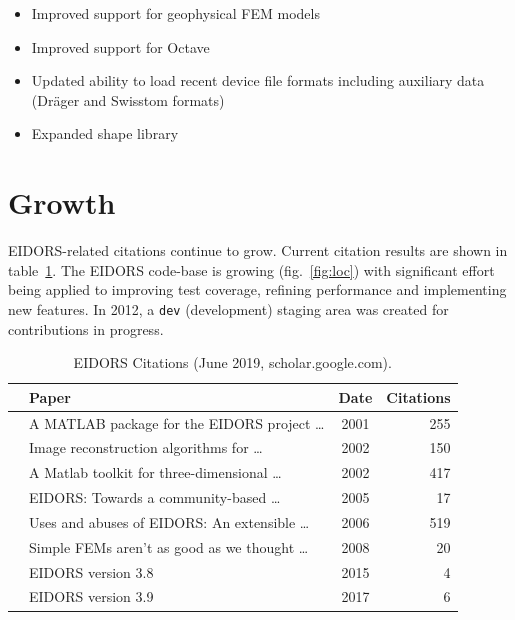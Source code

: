 \documentclass[10pt,letterpaper]{article}
\begin{document}
\begin{multicols}{2}
\begin{itemize}


\item Improved support for geophysical FEM models


\item Improved support for Octave

\item Updated ability to load recent device file formats including
       auxiliary data (Dr\"ager and Swisstom formats)




\item Expanded shape library
\end{itemize}

\section{Growth}
EIDORS-related citations continue to grow. Current citation results are
shown in table~\ref{tbl:cite}.
%
The EIDORS code-base is growing
(fig.~\ref{fig:loc})
 with significant effort being applied to
improving test coverage, refining performance and implementing new features.
 In 2012, a {\tt dev} (development) staging area was created for
contributions in progress.

\begin{table}[H]
  \footnotesize
\centering
\caption{\label{tbl:cite} EIDORS Citations
 (June 2019, scholar.google.com).
}
\begin{tabular}{r@{\hspace{1mm}}lcr}
  \toprule
  & Paper & Date & \hspace{-2mm}Citations \\
  \midrule
  \cite{vauhkonen2001} & A MATLAB package for the EIDORS project \ldots\hspace{-5mm}  
    & 2001 & 255 \\
  \cite{polydorides2002phd} & Image reconstruction algorithms for \ldots
    & 2002 & 150 \\
  \cite{polydorides2002matlab} & A Matlab toolkit for three-dimensional \ldots
    & 2002 & 417 \\
  \cite{adler2005} & EIDORS: Towards a community-based \ldots
    & 2005 & 17 \\
  \cite{adler2006} & Uses and abuses of {EIDORS}: An extensible \ldots
    & 2006 & 519 \\
  \cite{adler2008} & Simple FEMs aren't as good as we thought \ldots
    & 2008 &  20 \\
  \cite{adler2015} & EIDORS version 3.8
    & 2015 & 4 \\
  \cite{adler2017} & EIDORS version 3.9
    & 2017 & 6 \\
  \bottomrule
\end{tabular}
\vspace{-1em}
\end{table}


\end{multicols}
\end{document}
